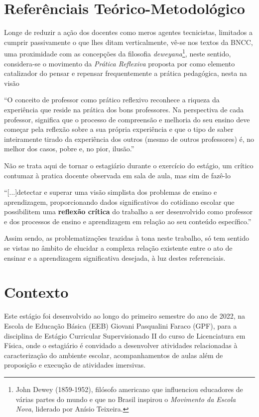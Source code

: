 \section{Referênciais Teórico-Metodológico}
Longe de reduzir a ação dos docentes como meros agentes tecnicistas, limitados a cumprir passivamente o que lhes ditam verticalmente, vê-se nos textos da BNCC, uma proximidade com as concepções da filosofia \emph{deweyana}\footnote{John Dewey (1859-1952), filósofo americano que influenciou educadores de várias partes do mundo e que no Brasil inspirou o \emph{Movimento da Escola Nova}, liderado por Anísio Teixeira.}, neste sentido, considera-se o movimento da \emph{Prática Reflexiva} proposta por \cite{ZEICHNER:1993} como elemento catalizador do pensar e repensar frequentemente a prática pedagógica, nesta na visão
\begin{citacao}
``O conceito de professor como prático reflexivo reconhece a riqueza da experiência que reside na prática dos bons professores. Na perspectiva de cada professor, significa que o processo de compreensão e melhoria do seu ensino deve começar pela reflexão sobre a sua própria experiência e que o tipo de saber inteiramente tirado da experiência dos outros (mesmo de outros professores) é, no melhor dos casos, pobre e, no pior, ilusão.'' 
\end{citacao}
Não se trata aqui de tornar o estagiário durante o exercício do estágio, um crítico contumaz à pratica docente observada em sala de aula, mas sim de fazê-lo 
\begin{citacao}
``[...]detectar e superar uma visão simplista dos problemas de ensino e aprendizagem, proporcionando dados significativos do cotidiano escolar que possibilitem uma \textbf{reflexão crítica} do trabalho a ser desenvolvido como professor e dos processos de ensino e aprendizagem em relação ao seu conteúdo específico.'' \cite[p. 11, \textbf{grifos meus}]{CARVALHOAMP:2012b} 
\end{citacao}
Assim sendo, as problematizações trazidas à tona neste trabalho, só tem sentido se vistas no âmbito de elucidar a complexa relação existente entre o ato de ensinar e a aprendizagem significativa desejada, à luz destes referenciais.

\section{Contexto}
Este estágio foi desenvolvido ao longo do primeiro semestre do ano de 2022, na Escola de Educação Básica (EEB) Giovani Pasqualini Faraco (GPF), para a disciplina de Estágio Curricular Supervisionado II do curso de Licenciatura em Física, onde o estagiário é convidado a desenvolver atividades relacionadas à caracterização do ambiente escolar, acompanhamentos de aulas além de proposição e execução de atividades imersivas.
 
